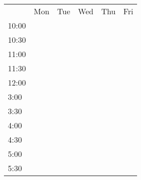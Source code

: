 \documentclass[11pt]{article}
\begin{document}
\begin{figure}[H]
\centering
\label{my-label}
\begin{tabular}{llllll}
                           & Mon                   & Tue                   & Wed                   & Thu                   & Fri                   \\ \cline{2-6} 
\multicolumn{1}{l|}{10:00} & \multicolumn{1}{l|}{} & \multicolumn{1}{l|}{} & \multicolumn{1}{l|}{} & \multicolumn{1}{l|}{} & \multicolumn{1}{l|}{} \\ \cline{2-6} 
\multicolumn{1}{l|}{10:30} & \multicolumn{1}{l|}{} & \multicolumn{1}{l|}{} & \multicolumn{1}{l|}{} & \multicolumn{1}{l|}{} & \multicolumn{1}{l|}{} \\ \cline{2-6} 
\multicolumn{1}{l|}{11:00} & \multicolumn{1}{l|}{} & \multicolumn{1}{l|}{} & \multicolumn{1}{l|}{} & \multicolumn{1}{l|}{} & \multicolumn{1}{l|}{} \\ \cline{2-6} 
\multicolumn{1}{l|}{11:30} & \multicolumn{1}{l|}{} & \multicolumn{1}{l|}{} & \multicolumn{1}{l|}{} & \multicolumn{1}{l|}{} & \multicolumn{1}{l|}{} \\ \cline{2-6} 
\multicolumn{1}{l|}{12:00} & \multicolumn{1}{l|}{} & \multicolumn{1}{l|}{} & \multicolumn{1}{l|}{} & \multicolumn{1}{l|}{} & \multicolumn{1}{l|}{} \\ \cline{2-6} 
\multicolumn{1}{l|}{3:00}  & \multicolumn{1}{l|}{} & \multicolumn{1}{l|}{} & \multicolumn{1}{l|}{} & \multicolumn{1}{l|}{} & \multicolumn{1}{l|}{} \\ \cline{2-6} 
\multicolumn{1}{l|}{3:30}  & \multicolumn{1}{l|}{} & \multicolumn{1}{l|}{} & \multicolumn{1}{l|}{} & \multicolumn{1}{l|}{} & \multicolumn{1}{l|}{} \\ \cline{2-6} 
\multicolumn{1}{l|}{4:00}  & \multicolumn{1}{l|}{} & \multicolumn{1}{l|}{} & \multicolumn{1}{l|}{} & \multicolumn{1}{l|}{} & \multicolumn{1}{l|}{} \\ \cline{2-6} 
\multicolumn{1}{l|}{4:30}  & \multicolumn{1}{l|}{} & \multicolumn{1}{l|}{} & \multicolumn{1}{l|}{} & \multicolumn{1}{l|}{} & \multicolumn{1}{l|}{} \\ \cline{2-6} 
\multicolumn{1}{l|}{5:00}  & \multicolumn{1}{l|}{} & \multicolumn{1}{l|}{} & \multicolumn{1}{l|}{} & \multicolumn{1}{l|}{} & \multicolumn{1}{l|}{} \\ \cline{2-6} 
\multicolumn{1}{l|}{5:30}  & \multicolumn{1}{l|}{} & \multicolumn{1}{l|}{} & \multicolumn{1}{l|}{} & \multicolumn{1}{l|}{} & \multicolumn{1}{l|}{} \\ \cline{2-6} 
\end{tabular}
\end{figure}
\end{document}
